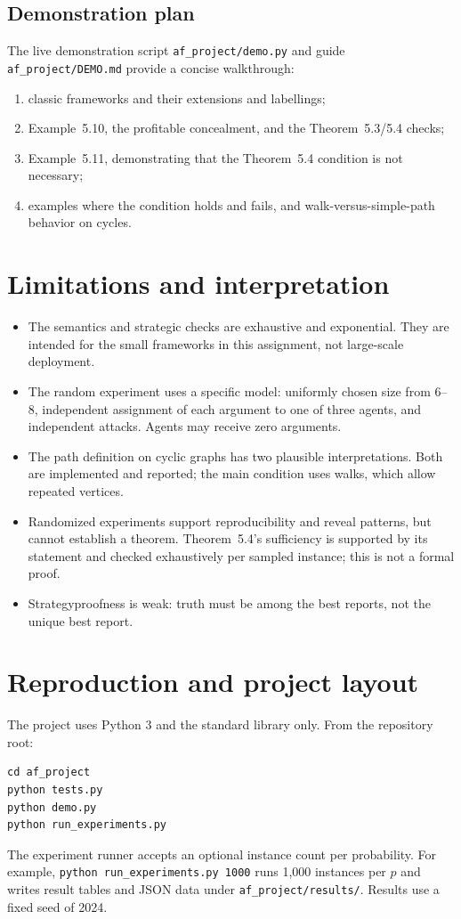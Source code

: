 \documentclass[11pt,a4paper]{article}
\newcommand{\code}[1]{\texttt{\small #1}}
\begin{document}
\subsection{Demonstration plan}
The live demonstration script \code{af\_project/demo.py} and guide \code{af\_project/DEMO.md} provide a concise walkthrough:
\begin{enumerate}
\item classic frameworks and their extensions and labellings;
\item Example~5.10, the profitable concealment, and the Theorem~5.3/5.4 checks;
\item Example~5.11, demonstrating that the Theorem~5.4 condition is not necessary;
\item examples where the condition holds and fails, and walk-versus-simple-path behavior on cycles.
\end{enumerate}

\section{Limitations and interpretation}
\begin{itemize}
\item The semantics and strategic checks are exhaustive and exponential. They are intended for the small frameworks in this assignment, not large-scale deployment.
\item The random experiment uses a specific model: uniformly chosen size from 6--8, independent assignment of each argument to one of three agents, and independent attacks. Agents may receive zero arguments.
\item The path definition on cyclic graphs has two plausible interpretations. Both are implemented and reported; the main condition uses walks, which allow repeated vertices.
\item Randomized experiments support reproducibility and reveal patterns, but cannot establish a theorem. Theorem~5.4's sufficiency is supported by its statement and checked exhaustively per sampled instance; this is not a formal proof.
\item Strategyproofness is weak: truth must be among the best reports, not the unique best report.
\end{itemize}

\section{Reproduction and project layout}
The project uses Python 3 and the standard library only. From the repository root:
\begin{lstlisting}[style=shell]
cd af_project
python tests.py
python demo.py
python run_experiments.py
\end{lstlisting}
The experiment runner accepts an optional instance count per probability. For example, \code{python run\_experiments.py 1000} runs 1,000 instances per $p$ and writes result tables and JSON data under \code{af\_project/results/}. Results use a fixed seed of 2024.
\end{document}
